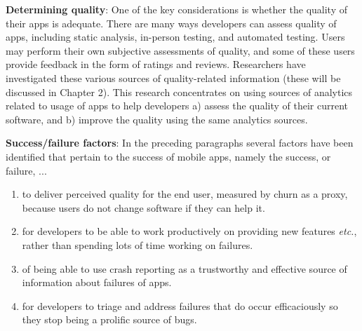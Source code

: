 
\medskip
\textbf{Determining quality}: One of the key considerations is whether the quality of their apps is adequate. There are many ways developers can assess quality of apps, including static analysis, in-person testing, and automated testing. Users may perform their own subjective assessments of quality, and some of these users provide feedback in the form of ratings and reviews. Researchers have investigated these various sources of quality-related information (these will be discussed in Chapter 2). This research concentrates on using sources of analytics related to usage of apps to help developers a) assess the quality of their current software, and b) improve the quality using the same analytics sources.


\medskip
\textbf{Success/failure factors}: %
In the preceding paragraphs several factors have been identified that pertain to the success of mobile apps, namely the success, or failure, ...
\begin{enumerate}
    \itemsep0em
    \item to deliver perceived quality for the end user, measured by churn as a proxy, because users do not change software if they can help it. %
    \item for developers to be able to work productively on providing new features \emph{etc.}, rather than spending lots of time working on failures.
    \item of being able to use crash reporting as a trustworthy and effective source of information about failures of apps.
    \item for developers to triage and address failures that do occur efficaciously so they stop being a prolific source of bugs.
\end{enumerate}

